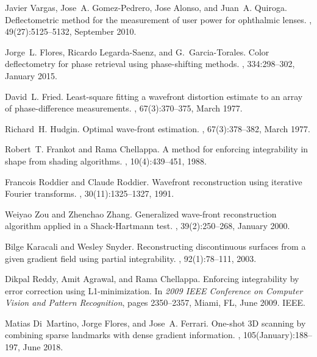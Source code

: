 \documentclass[12pt,letterpaper]{article}
\begin{document}
\begin{thebibliography}{10}
	Javier Vargas, Jose~A. {Gomez-Pedrero}, Jose Alonso, and Juan~A. Quiroga.
	\newblock Deflectometric method for the measurement of user power for
	ophthalmic lenses.
	, 49(27):5125--5132, September 2010.
	
	Jorge~L. Flores, Ricardo {Legarda-Saenz}, and G.~{Garcia-Torales}.
	\newblock Color deflectometry for phase retrieval using phase-shifting methods.
	, 334:298--302, January 2015.
	
	David~L. Fried.
	\newblock Least-square fitting a wavefront distortion estimate to an array of
	phase-difference measurements.
	, 67(3):370--375,
	March 1977.
	
	Richard~H. Hudgin.
	\newblock Optimal wave-front estimation.
	, 67(3):378--382,
	March 1977.
	
	Robert~T. Frankot and Rama Chellappa.
	\newblock A method for enforcing integrability in shape from shading
	algorithms.
	,
	10(4):439--451, 1988.
	
	Francois Roddier and Claude Roddier.
	\newblock Wavefront reconstruction using iterative {{Fourier}} transforms.
	, 30(11):1325--1327, 1991.
	
	Weiyao Zou and Zhenchao Zhang.
	\newblock Generalized wave-front reconstruction algorithm applied in a
	{{Shack-Hartmann}} test.
	, 39(2):250--268, January 2000.
	
	Bilge Karacali and Wesley Snyder.
	\newblock Reconstructing discontinuous surfaces from a given gradient field
	using partial integrability.
	, 92(1):78--111, 2003.
	
	Dikpal Reddy, Amit Agrawal, and Rama Chellappa.
	\newblock Enforcing integrability by error correction using
	{{L1-minimization}}.
	\newblock In {\em 2009 {{IEEE Conference}} on {{Computer Vision}} and {{Pattern
				Recognition}}}, pages 2350--2357, {Miami, FL}, June 2009. {IEEE}.
	
	Matias Di~Martino, Jorge Flores, and Jose~A. Ferrari.
	\newblock One-shot {{3D}} scanning by combining sparse landmarks with dense
	gradient information.
	, 105(January):188--197, June
	2018.
	

\end{thebibliography}
\end{document}
